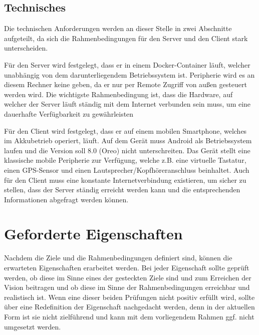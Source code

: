\subsection{Technisches}

Die technischen Anforderungen werden an dieser Stelle in zwei Abschnitte aufgeteilt, da sich die Rahmenbedingungen für den Server und den Client stark unterscheiden. 

\vspace{0.25cm}

Für den Server wird festgelegt, dass er in einem Docker-Container\cite{Turnbull.2014} läuft, welcher unabhängig von dem darunterliegendem Betriebssystem ist. Peripherie wird es an diesem Rechner keine geben, da er nur per Remote Zugriff von außen gesteuert werden wird. Die wichtigste Rahmenbedingung ist, dass die Hardware, auf welcher der Server läuft ständig mit dem Internet verbunden sein muss, um eine dauerhafte Verfügbarkeit zu gewährleisten

\vspace{0.25cm}

Für den Client wird festgelegt, dass er auf einem mobilen Smartphone, welches im Akkubetrieb operiert, läuft. Auf dem Gerät muss Android als Betriebssystem laufen und die Version soll 8.0 (Oreo) nicht unterschreiten. Das Gerät stellt eine klassische mobile Peripherie zur Verfügung, welche z.B. eine virtuelle Tastatur, einen GPS-Sensor und einen Lautsprecher/Kopfhöreranschluss beinhaltet. Auch für den Client muss eine konstante Internetverbindung existieren, um sicher zu stellen, dass der Server ständig erreicht werden kann und die entsprechenden Informationen abgefragt werden können.

\section{Geforderte Eigenschaften}
Nachdem die Ziele und die Rahmenbedingungen definiert sind, können die erwarteten Eigenschaften erarbeitet werden. Bei jeder Eigenschaft sollte geprüft werden, ob diese im Sinne eines der gesteckten Ziele sind und zum Erreichen der Vision beitragen und ob diese im Sinne der Rahmenbedingungen erreichbar und realistisch ist. Wenn eine dieser beiden Prüfungen nicht positiv erfüllt wird, sollte über eine Redefinition der Eigenschaft nachgedacht werden, denn in der aktuellen Form ist sie nicht zielführend und kann mit dem vorliegendem Rahmen ggf. nicht umgesetzt werden.

\vspace{0.25cm}

